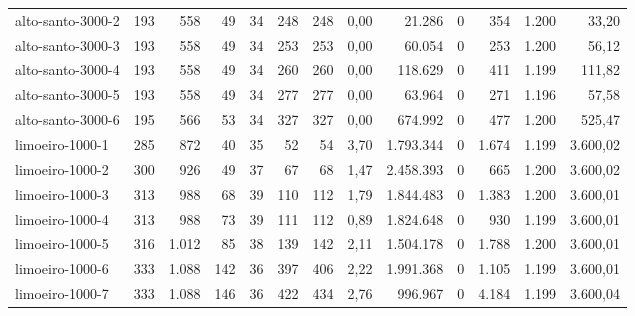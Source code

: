 \begin{table}[ht!]
{\begin{tabular}{lrrrrrrrrrrrr}
			\rowcolor{rowgrey}alto-santo-3000-2                                                       & 193 & 558   & 49  & 34 & 248 & 248 & 0,00  & 21.286    & 0 & 354    & 1.200 & 33,20    \\
			\rowcolor{rowgrey}alto-santo-3000-3                                                       & 193 & 558   & 49  & 34 & 253 & 253 & 0,00  & 60.054    & 0 & 253    & 1.200 & 56,12    \\
			\rowcolor{rowgrey}alto-santo-3000-4                                                       & 193 & 558   & 49  & 34 & 260 & 260 & 0,00  & 118.629   & 0 & 411    & 1.199 & 111,82   \\
			\rowcolor{rowgrey}alto-santo-3000-5                                                       & 193 & 558   & 49  & 34 & 277 & 277 & 0,00  & 63.964    & 0 & 271    & 1.196 & 57,58    \\
			\rowcolor{rowgrey}alto-santo-3000-6                                                       & 195 & 566   & 53  & 34 & 327 & 327 & 0,00  & 674.992   & 0 & 477    & 1.200 & 525,47   \\
			\midrule
			\rowcolor{rowlight}limoeiro-1000-1                                                        & 285 & 872   & 40  & 35 & 52  & 54  & 3,70  & 1.793.344 & 0 & 1.674  & 1.199 & 3.600,02 \\
			\rowcolor{rowlight}limoeiro-1000-2                                                        & 300 & 926   & 49  & 37 & 67  & 68  & 1,47  & 2.458.393 & 0 & 665    & 1.200 & 3.600,02 \\
			\rowcolor{rowlight}limoeiro-1000-3                                                        & 313 & 988   & 68  & 39 & 110 & 112 & 1,79  & 1.844.483 & 0 & 1.383  & 1.200 & 3.600,01 \\
			\rowcolor{rowlight}limoeiro-1000-4                                                        & 313 & 988   & 73  & 39 & 111 & 112 & 0,89  & 1.824.648 & 0 & 930    & 1.199 & 3.600,01 \\
			\rowcolor{rowlight}limoeiro-1000-5                                                        & 316 & 1.012 & 85  & 38 & 139 & 142 & 2,11  & 1.504.178 & 0 & 1.788  & 1.200 & 3.600,01 \\
			\rowcolor{rowlight}limoeiro-1000-6                                                        & 333 & 1.088 & 142 & 36 & 397 & 406 & 2,22  & 1.991.368 & 0 & 1.105  & 1.199 & 3.600,01 \\
			\rowcolor{rowlight}limoeiro-1000-7                                                        & 333 & 1.088 & 146 & 36 & 422 & 434 & 2,76  & 996.967   & 0 & 4.184  & 1.199 & 3.600,04 \\

\end{tabular}}
\end{table}
